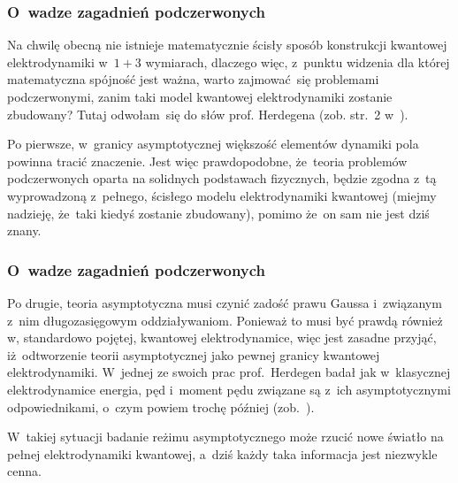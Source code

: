 \documentclass[10pt,t]{beamer}
\begin{document}
\begin{frame}
  \frametitle{O~wadze zagadnień podczerwonych}


  Na chwilę obecną nie istnieje matematycznie ścisły sposób konstrukcji
  kwantowej elektrodynamiki w~$1 + 3$ wymiarach, dlaczego więc, z~punktu
  widzenia dla której matematyczna spójność jest ważna, warto zajmować~się
  problemami podczerwonymi, zanim taki model kwantowej elektrodynamiki
  zostanie zbudowany? Tutaj odwołam~się do słów prof. Herdegena (zob.
  str.~2
  w~\parencite{Herdegen-Semidirect-product-of-CCR-and-CAR-algebras-ETC-Pub-1998}).

  Po pierwsze, w~granicy asymptotycznej większość elementów dynamiki pola
  powinna tracić znaczenie. Jest więc prawdopodobne, że~teoria problemów
  podczerwonych oparta na solidnych podstawach fizycznych, będzie zgodna
  z~tą wyprowadzoną z~pełnego, ścisłego modelu elektrodynamiki kwantowej
  (miejmy nadzieję, że~taki kiedyś zostanie zbudowany), pomimo że~on
  sam nie jest dziś znany.

\end{frame}





\begin{frame}
  \frametitle{O~wadze zagadnień podczerwonych}


  Po drugie, teoria asymptotyczna musi czynić zadość prawu Gaussa
  i~związanym z~nim długozasięgowym oddziaływaniom. Ponieważ to musi być
  prawdą również w, standardowo pojętej, kwantowej elektrodynamice, więc
  jest zasadne przyjąć, iż~odtworzenie teorii asymptotycznej jako pewnej
  granicy kwantowej elektrodynamiki. W~jednej ze swoich prac prof.~Herdegen
  badał jak w~\alert{klasycznej} elektrodynamice energia, pęd i~moment pędu
  związane są z~ich asymptotycznymi odpowiednikami, o~czym powiem
  trochę później
  (zob.~\parencite{Herdegen-Long-range-effects-in-asymptotic-ETC-Pub-1995}).

  W~takiej sytuacji badanie reżimu asymptotycznego może rzucić nowe światło
  na pełnej elektrodynamiki kwantowej, a~dziś każdy taka informacja jest
  niezwykle cenna.

\end{frame}










\end{document}
